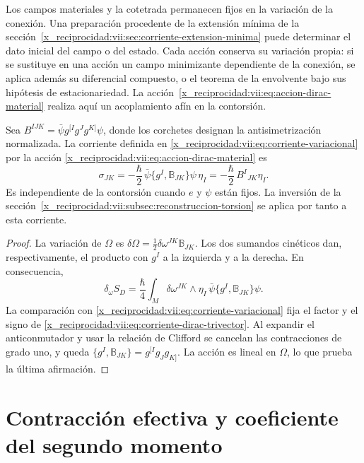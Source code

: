 Los campos materiales y la cotetrada permanecen fijos en la variación
de la conexión. Una preparación procedente de la extensión mínima de
la sección~\ref{x_reciprocidad:vii:sec:corriente-extension-minima} puede determinar
el dato inicial del campo o del estado. Cada acción conserva su
variación propia: si se sustituye en una acción un campo minimizante
dependiente de la conexión, se aplica además su diferencial compuesto,
o el teorema de la envolvente bajo sus hipótesis de estacionariedad.
La acción~\eqref{x_reciprocidad:vii:eq:accion-dirac-material} realiza aquí un
acoplamiento afín en la contorsión.

\begin{proposition}
\label{x_reciprocidad:vii:prop:corriente-dirac-explicita}
Sea
\(B^{IJK}=\bar\psi g^{[I}g^Jg^{K]}\psi\), donde los corchetes
designan la antisimetrización normalizada. La corriente definida en
\eqref{x_reciprocidad:vii:eq:corriente-variacional} por la acción
\eqref{x_reciprocidad:vii:eq:accion-dirac-material} es
\begin{equation}
 \sigma_{JK}
 =-\frac{\hbar}{2}\,
   \bar\psi\{g^I,\mathbb B_{JK}\}\psi\,\eta_I
 =-\frac{\hbar}{2}\,B^I{}_{JK}\eta_I.
 \label{x_reciprocidad:vii:eq:corriente-dirac-trivector}
\end{equation}
Es independiente de la contorsión cuando \(e\) y \(\psi\) están
fijos. La inversión de la sección~\ref{x_reciprocidad:vii:subsec:reconstruccion-torsion}
se aplica por tanto a esta corriente.
\end{proposition}
\begin{proof}
La variación de \(\Omega\) es
\(\delta\Omega=\frac12\delta\omega^{JK}\mathbb B_{JK}\).
Los dos sumandos cinéticos dan, respectivamente, el producto con
\(g^I\) a la izquierda y a la derecha. En consecuencia,
\[
 \delta_\omega S_D
 =\frac{\hbar}{4}\int_M\delta\omega^{JK}\wedge\eta_I\,
                 \bar\psi\{g^I,\mathbb B_{JK}\}\psi.
\]
La comparación con \eqref{x_reciprocidad:vii:eq:corriente-variacional} fija el
factor y el signo de \eqref{x_reciprocidad:vii:eq:corriente-dirac-trivector}.
Al expandir el anticonmutador y usar la relación de Clifford se
cancelan las contracciones de grado uno, y queda
\(\{g^I,\mathbb B_{JK}\}=g^{[I}g_Jg_{K]}\).
La acción es lineal en \(\Omega\), lo que prueba la última
afirmación.
\end{proof}

\section{Contracción efectiva y coeficiente del segundo momento}
\label{x_reciprocidad:vii:subsec:contraccion-espinorial}

